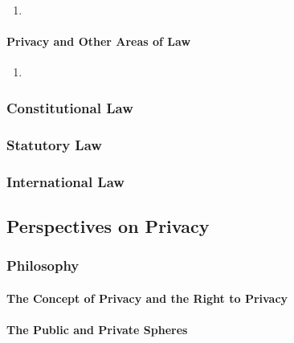 \begin{enumerate}
    \item %
\end{enumerate}

\paragraph{Privacy and Other Areas of Law}

\begin{enumerate}
    \item %
\end{enumerate}

\subsubsection{Constitutional Law}


\subsubsection{Statutory Law}


\subsubsection{International Law}


\subsection{Perspectives on Privacy}

\subsubsection{Philosophy}

\paragraph{The Concept of Privacy and the Right to Privacy}


\paragraph{The Public and Private Spheres}


